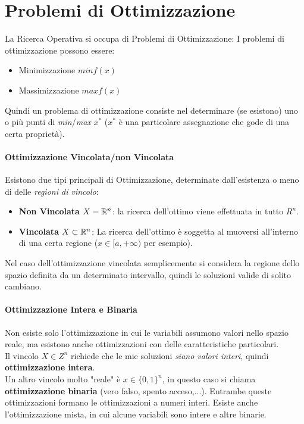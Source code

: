 \documentclass[12pt, a4paper, openany]{book}
\begin{document}
\section{Problemi di Ottimizzazione}
La Ricerca Operativa si occupa di Problemi di Ottimizzazione:
I problemi di ottimizzazione possono essere:
\begin{itemize}
    \item Minimizzazione $min f(x)$
    \item Massimizzazione $max f(x)$
\end{itemize}

Quindi un problema di ottimizzazione consiste nel determinare (se esistono) uno o più punti di \emph{min}/\emph{max} $x^*$ ($x^*$ è una particolare assegnazione che gode di una certa proprietà).

\paragraph*{Ottimizzazione Vincolata/non Vincolata}
Esistono due tipi principali di Ottimizzazione, determinate dall'esistenza o meno di delle \emph{regioni di vincolo}:
\begin{itemize}
    \item \textbf{Non Vincolata} $X = \mathbb{R}^n$: la ricerca dell'ottimo viene effettuata in tutto $R^n$.
    \item \textbf{Vincolata} $X \subset \mathbb{R}^n$: La ricerca dell'ottimo è soggetta al muoversi all'interno di una certa regione ($x \in [a, +\infty)$ per esempio).
\end{itemize}

Nel caso dell'ottimizzazione vincolata semplicemente si considera la regione dello spazio definita da un determinato intervallo,
quindi le soluzioni valide di solito cambiano.
\paragraph*{Ottimizzazione Intera e Binaria}
Non esiste solo l'ottimizzazione in cui le variabili assumono valori nello spazio reale, ma esistono anche ottimizzazioni con delle caratteristiche particolari.
\\Il vincolo $X\in Z^n$ richiede che le mie soluzioni \emph{siano valori interi}, quindi \textbf{ottimizzazione intera}.
\\Un altro vincolo molto "reale" è $x\in \{0,1\}^n$, in questo caso si chiama \textbf{ottimizzazione binaria} (vero falso, spento acceso,...).
Entrambe queste ottimizzazioni formano le ottimizzazioni a numeri interi.
Esiste anche l'ottimizzazione mista, in cui alcune variabili sono intere e altre binarie.
\end{document}
